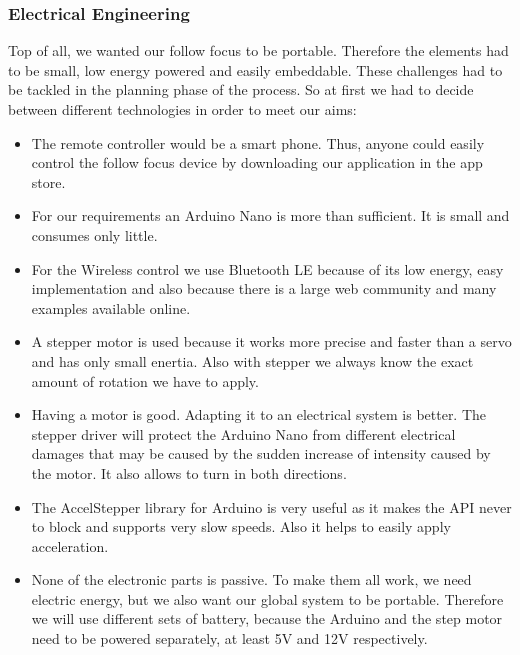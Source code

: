 \documentclass{sigchi}
\begin{document}
\subsubsection{Electrical Engineering}
Top of all, we wanted our follow focus to be portable. Therefore the elements had to be small, low energy powered and easily embeddable. These challenges had to be tackled in the planning phase of the process. So at first we had to decide between different technologies in order to meet our aims:
\begin{itemize}
\item The remote controller would be a smart phone. Thus, anyone could easily control the follow focus device by downloading our application in the app store.
\item For our requirements an Arduino Nano is more than sufficient. It is small and consumes only little.
\item For the Wireless control we use Bluetooth LE because of its low energy, easy implementation and also because there is a large web community and many examples available online.
\item A stepper motor is used because it works more precise and faster than a servo and has only small enertia. Also with stepper we always know the exact amount of rotation we have to apply.
\item Having a motor is good. Adapting it to an electrical system is better. The stepper driver will protect the Arduino Nano from different electrical damages that may be caused by the sudden increase of intensity caused by the motor. It also allows to turn in both directions.
\item The AccelStepper library for Arduino is very useful as it makes the API never to block and supports very slow speeds. Also it helps to easily apply acceleration.
\item None of the electronic parts is passive. To make them all work, we need electric energy, but we also want our global system to be portable. Therefore we will use different sets of battery, because the Arduino and the step motor need to be powered separately, at least 5V and 12V respectively.
\end{itemize}
\end{document}
